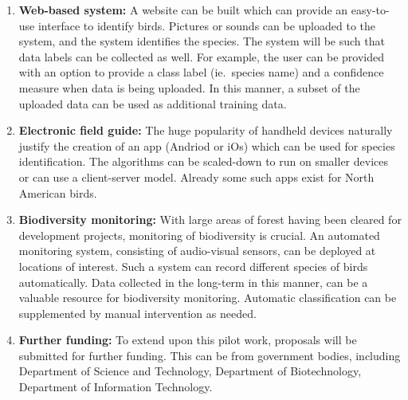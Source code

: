 \documentclass{article}
\begin{document}
\begin{enumerate}
\item \textbf{Web-based system:} A website can be built which can provide an
easy-to-use interface to identify birds. Pictures or sounds can be uploaded to
the system, and the system identifies the species. The system will be such that
data labels can be collected as well. For example, the user can be provided with
an option to provide a class label (ie.~species name) and a confidence measure
when data is being uploaded. In this manner, a subset of the uploaded data can be
used as additional training data.

\item \textbf{Electronic field guide:} The huge popularity of handheld
devices naturally justify the creation of an app (Andriod or iOs) which can be
used for species identification. The algorithms can be scaled-down to run on 
smaller devices or can use a client-server model. Already some such apps exist
for North American birds.

\item \textbf{Biodiversity monitoring:} With large areas of forest having been cleared
for development projects, monitoring of biodiversity is crucial. An automated
monitoring system, consisting of audio-visual sensors, can be deployed at
locations of interest. Such a system can record different species of birds
automatically. Data collected in the long-term in this manner, can be a
valuable resource for biodiversity monitoring. Automatic classification can be
supplemented by manual intervention as needed.

\item \textbf{Further funding:} To extend upon this pilot work, proposals will be submitted for further
funding. This can be from government bodies, including Department of Science and
Technology, Department of Biotechnology, Department of Information Technology.

\end{enumerate}

\end{document}
